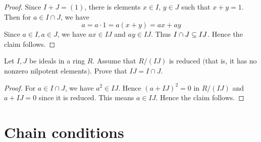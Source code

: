 \begin{proof}
Since $I+J=(1)$, there is elements $x\in I$, $y\in J$ such that $x+y=1$. Then for $a\in I\cap J$, we have
\[a=a\cdot 1=a(x+y)=ax+ay\]
Since $a\in I, a\in J$, we have $ax\in IJ$ and $ay\in IJ$. Thus $I\cap J\subseteq IJ$. Hence the claim follows.
\end{proof}
\begin{exercise}
Let $I,J$ be ideals in a ring $R$. Assume that $R/(IJ)$ is reduced $($that is, it has no nonzero nilpotent elements$)$. Prove that $IJ=I\cap J$.
\end{exercise}
\begin{proof}
For $a\in I\cap J$, we have $a^2\in IJ$. Hence $(a+IJ)^2=0$ in $R/(IJ)$ and $a+IJ=0$ since it is reduced. This means $a\in IJ$. Hence the claim follows.
\end{proof}
\chapter{Chain conditions}
